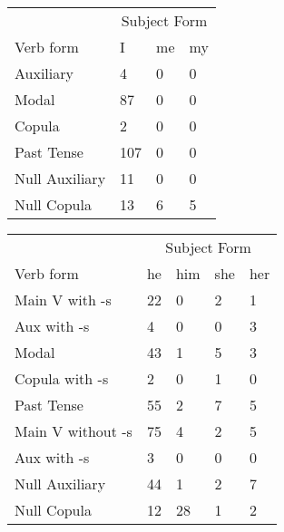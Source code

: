 \begin{table}[]
    \begin{minipage}{0.5\textwidth}
    \centering
    \begin{tabular}{@{}llll@{}}
        \toprule
            &\multicolumn{3}{c}{Subject Form}\\
            \cline{2-4}
        Verb form & I & me & my \\
        \midrule
        Auxiliary & 4 & 0 & 0 \\
        Modal & 87 & 0 & 0 \\
        Copula & 2 & 0 & 0 \\
        Past Tense & 107 & 0 & 0 \\
        \hline
        Null Auxiliary & 11 & 0 & 0 \\
        Null Copula & 13 & 6 & 5 \\
        \bottomrule
    \end{tabular}
\end{minipage}
\begin{minipage}{0.5\textwidth}
    \centering
    \begin{tabular}{@{}lllll@{}}
        \toprule
            &\multicolumn{4}{c}{Subject Form}\\
            \cline{2-5}
        Verb form & he & him & she & her \\
        \midrule
        Main V with -s & 22 & 0 & 2 & 1 \\
        Aux with -s & 4 & 0 & 0 & 3 \\
        Modal & 43 & 1 & 5 & 3 \\
        Copula with -s & 2 & 0 & 1 & 0 \\
        Past Tense & 55 & 2 & 7 & 5 \\
        \hline
        Main V without -s & 75 & 4 & 2 & 5 \\
        Aux with -s & 3 & 0 & 0 & 0 \\
        Null Auxiliary & 44 & 1 & 2 & 7 \\
        Null Copula & 12 & 28 & 1 & 2 \\
        \bottomrule
    \end{tabular}
\end{minipage}
\end{table}
